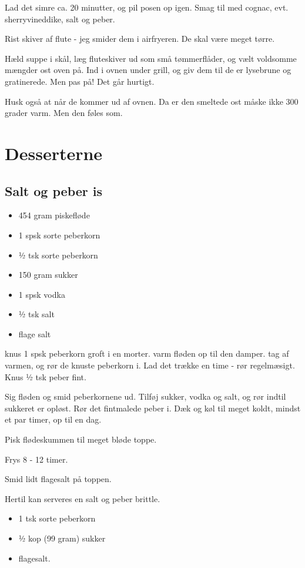 \documentclass[
]{book}
\providecommand{\tightlist}{%
  \setlength{\itemsep}{0pt}\setlength{\parskip}{0pt}}
\begin{document}
Lad det simre ca. 20 minutter, og pil posen op igen. Smag til med
cognac, evt. sherryvineddike, salt og peber.

Rist skiver af flute - jeg smider dem i airfryeren. De skal være meget
tørre.

Hæld suppe i skål, læg fluteskiver ud som små tømmerflåder, og vælt
voldsomme mængder ost oven på. Ind i ovnen under grill, og giv dem til
de er lysebrune og gratinerede. Men pas på! Det går hurtigt.

Husk også at når de kommer ud af ovnen. Da er den smeltede ost måske ikke
300 grader varm. Men den føles som.

\chapter{Desserterne}\label{desserterne}

\section{Salt og peber is}\label{salt-og-peber-is}

\begin{itemize}
\tightlist
\item
  454 gram piskefløde
\item
  1 spsk sorte peberkorn
\item
  ½ tsk sorte peberkorn
\item
  150 gram sukker
\item
  1 spsk vodka
\item
  ½ tsk salt
\item
  flage salt
\end{itemize}

knus 1 spsk peberkorn groft i en morter.
varm fløden op til den damper. tag af varmen, og rør de
knuste peberkorn i. Lad det trække en time - rør regelmæsigt.
Knus ½ tsk peber fint.

Sig fløden og smid peberkornene ud. Tilføj sukker,
vodka og salt, og rør indtil sukkeret er opløst.
Rør det fintmalede peber i. Dæk og køl til meget
koldt, mindst et par timer, op til en dag.

Pisk flødeskummen til meget bløde toppe.

Frys 8 - 12 timer.

Smid lidt flagesalt på toppen.

Hertil kan serveres en salt og peber brittle.

\begin{itemize}
\tightlist
\item
  1 tsk sorte peberkorn
\item
  ½ kop (99 gram) sukker
\item
  flagesalt.
\end{itemize}
\end{document}
